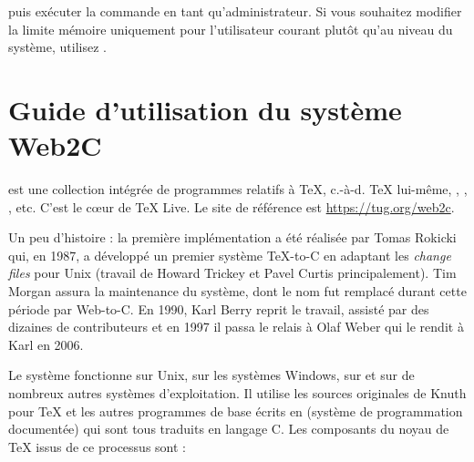 \documentclass[german, english, french, 12pt]{article}
\renewcommand{\TL}{\TeX{} Live\xspace}%
\begin{document}
\noindent puis exécuter la commande  en tant
qu'administrateur. Si vous souhaitez modifier la limite mémoire uniquement pour
l'utilisateur courant plutôt qu'au niveau du système, utilisez
.


\section{Guide d'utilisation du système Web2C}

\Webc{} est une collection intégrée de programmes relatifs à \TeX,
c.-à-d. \TeX{} lui-même, \MF{}, \MP, \BibTeX{}, etc.  C'est le cœur de \TL{}. Le
site de référence est \url{https://tug.org/web2c}.

Un peu d'histoire : la première implémentation a été réalisée par Tomas Rokicki
qui, en 1987, a développé un premier système \TeX{}-to-C en adaptant les
\textit{change files} pour Unix (travail de Howard Trickey et Pavel Curtis
principalement).  Tim Morgan assura la maintenance du système, dont le nom fut
remplacé durant cette période par Web-to-C.  En 1990, Karl Berry reprit le
travail, assisté par des dizaines de contributeurs et en 1997 il passa le relais
à Olaf Weber qui le rendit à Karl en 2006.

Le système \Webc{} fonctionne sur Unix, sur les systèmes Windows, sur
\macOS{} et sur de nombreux autres systèmes d'exploitation.  Il utilise les
sources originales de Knuth pour \TeX{} et les autres programmes de base écrits
en \web{} (système de programmation documentée) qui sont tous traduits en
langage C. Les composants du noyau de \TeX{} issus de ce processus sont :
\end{document}
